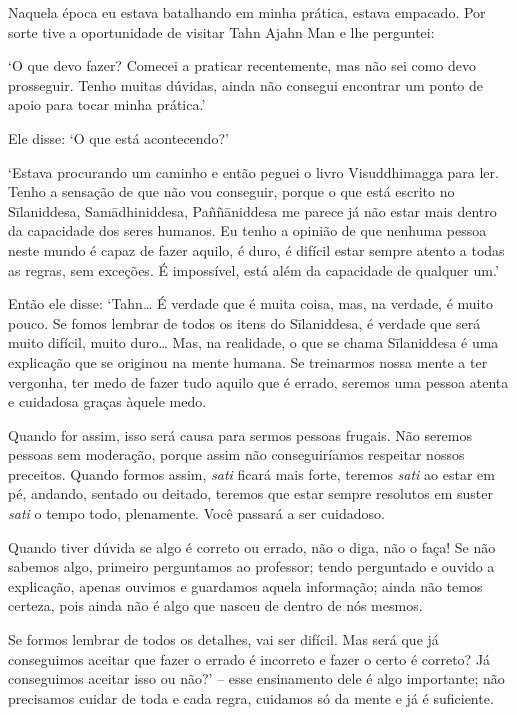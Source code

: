 Naquela época eu estava batalhando em minha prática, estava empacado.
Por sorte tive a oportunidade de visitar Tahn Ajahn Man e lhe perguntei:

`O que devo fazer? Comecei a praticar recentemente, mas não sei como
devo prosseguir. Tenho muitas dúvidas, ainda não consegui encontrar um
ponto de apoio para tocar minha prática.'

Ele disse: `O que está acontecendo?'

`Estava procurando um caminho e então peguei o livro Visuddhimagga para
ler. Tenho a sensação de que não vou conseguir, porque o que está
escrito no Sīlaniddesa, Samādhiniddesa, Paññāniddesa me parece já não
estar mais dentro da capacidade dos seres humanos. Eu tenho a opinião de
que nenhuma pessoa neste mundo é capaz de fazer aquilo, é duro, é
difícil estar sempre atento a todas as regras, sem exceções. É
impossível, está além da capacidade de qualquer um.'

Então ele disse: `Tahn\ldots{} É verdade que é muita coisa, mas, na
verdade, é muito pouco. Se fomos lembrar de todos os itens do
Sīlaniddesa, é verdade que será muito difícil, muito duro\ldots{} Mas,
na realidade, o que se chama Sīlaniddesa é uma explicação que se
originou na mente humana. Se treinarmos nossa mente a ter vergonha, ter
medo de fazer tudo aquilo que é errado, seremos uma pessoa atenta e
cuidadosa graças àquele medo.

Quando for assim, isso será causa para sermos pessoas frugais. Não
seremos pessoas sem moderação, porque assim não conseguiríamos respeitar
nossos preceitos. Quando formos assim, \emph{sati} ficará mais forte,
teremos \emph{sati} ao estar em pé, andando, sentado ou deitado, teremos
que estar sempre resolutos em suster \emph{sati} o tempo todo,
plenamente. Você passará a ser cuidadoso.

Quando tiver dúvida se algo é correto ou errado, não o diga, não o faça!
Se não sabemos algo, primeiro perguntamos ao professor; tendo perguntado
e ouvido a explicação, apenas ouvimos e guardamos aquela informação;
ainda não temos certeza, pois ainda não é algo que nasceu de dentro de
nós mesmos.

Se formos lembrar de todos os detalhes, vai ser difícil. Mas será que já
conseguimos aceitar que fazer o errado é incorreto e fazer o certo é
correto? Já conseguimos aceitar isso ou não?' -- esse ensinamento dele é
algo importante; não precisamos cuidar de toda e cada regra, cuidamos só
da mente e já é suficiente.

